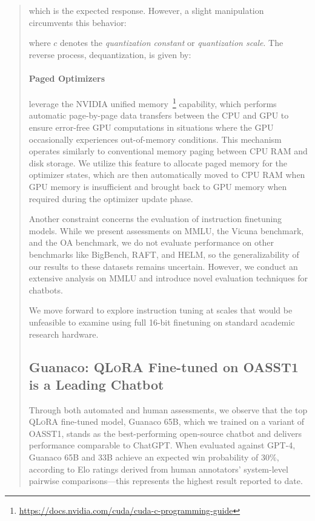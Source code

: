 \begin{quote}
which is the expected response. However, a slight manipulation circumvents this behavior:

where $c$ denotes the {\em quantization constant} or {\em quantization scale}. The reverse process, dequantization, is given by:

\paragraph{Paged Optimizers} leverage the NVIDIA unified memory~\footnote{\tiny \url{https://docs.nvidia.com/cuda/cuda-c-programming-guide}} capability, which performs automatic page-by-page data transfers between the CPU and GPU to ensure error-free GPU computations in situations where the GPU occasionally experiences out-of-memory conditions. This mechanism operates similarly to conventional memory paging between CPU RAM and disk storage. We utilize this feature to allocate paged memory for the optimizer states, which are then automatically moved to CPU RAM when GPU memory is insufficient and brought back to GPU memory when required during the optimizer update phase.

Another constraint concerns the evaluation of instruction finetuning models. While we present assessments on MMLU, the Vicuna benchmark, and the OA benchmark, we do not evaluate performance on other benchmarks like BigBench, RAFT, and HELM, so the generalizability of our results to these datasets remains uncertain. However, we conduct an extensive analysis on MMLU and introduce novel evaluation techniques for chatbots.

We move forward to explore instruction tuning at scales that would be unfeasible to examine using full 16-bit finetuning on standard academic research hardware.

\subsection{\textbf{Guanaco}: \textsc{QLoRA} Fine-tuned on OASST1 is a Leading Chatbot} Through both automated and human assessments, we observe that the top \textsc{QLoRA} fine-tuned model, {Guanaco} 65B, which we trained on a variant of OASST1, stands as the best-performing open-source chatbot and delivers performance comparable to ChatGPT. When evaluated against GPT-4, {Guanaco} 65B and 33B achieve an expected win probability of 30\%, according to Elo ratings derived from human annotators' system-level pairwise comparisons—this represents the highest result reported to date.


\end{quote}
